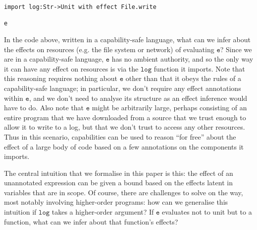 \documentclass[sigplan,10pt,review]{acmart}\settopmatter{printfolios=true,printccs=false,printacmref=false}
\newcommand{\kwat}[1]{$\kwa{#1}$}
\newcommand{\kwa}[1]{\mathtt{#1}}
\newcommand{\epscalc}{\kwa{CC}}
\begin{document}
\begin{lstlisting}
import log:Str->Unit with effect File.write

e
\end{lstlisting}

In the code above, written in a capability-safe language, what can we infer about the effects on resources (e.g. the file system or network) of evaluating \kwat{e}?
Since we are in a capability-safe language, \kwat{e} has no ambient authority, and so the only way it can have any effect on resources is via the \kwat{log} function it imports.
Note that this reasoning requires nothing about \kwat{e} other than that it obeys the rules of a capability-safe language; in particular, we don't require any effect annotations within \kwat{e}, and we don't need to analyse its structure as an effect inference would have to do.
Also note that \kwat{e} might be arbitrarily large, perhaps consisting of an entire program that we have downloaded from a source that we trust enough to allow it to write to a log, but that we don't trust to access any other resources.
Thus in this scenario, capabilities can be used to reason ``for free'' about the effect of a large body of code based on a few annotations on the components it imports.

The central intuition that we formalise in this paper is this: the effect of an unannotated expression can be given a bound based on the effects latent in variables that are in scope.
Of course, there are challenges to solve on the way, most notably involving higher-order programs: how can we generalise this intuition if \kwat{log} takes a higher-order argument?
If \kwat{e} evaluates not to unit but to a function, what can we infer about that function's effects?

%
\end{document}

